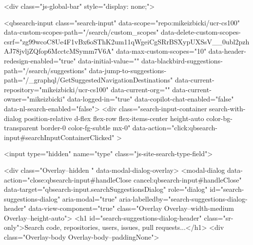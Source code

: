       <div class="js-global-bar" style="display: none;">
        


<qbsearch-input class="search-input" data-scope="repo:mikeizbicki/ucr-cs100" data-custom-scopes-path="/search/custom_scopes" data-delete-custom-scopes-csrf="zg99wcoC8Ue4F1vBx6oSThK2um11qWgeiCgSRrBSXypUXSsV__0ubl2pzhAJ78jvljZQfop6McctcMSymm7V6A" data-max-custom-scopes="10" data-header-redesign-enabled="true" data-initial-value="" data-blackbird-suggestions-path="/search/suggestions" data-jump-to-suggestions-path="/_graphql/GetSuggestedNavigationDestinations" data-current-repository="mikeizbicki/ucr-cs100" data-current-org="" data-current-owner="mikeizbicki" data-logged-in="true" data-copilot-chat-enabled="false" data-nl-search-enabled="false">
  <div
    class="search-input-container search-with-dialog position-relative d-flex flex-row flex-items-center height-auto color-bg-transparent border-0 color-fg-subtle mx-0"
    data-action="click:qbsearch-input#searchInputContainerClicked"
  >

    <input type="hidden" name="type" class="js-site-search-type-field">

    
<div class="Overlay--hidden " data-modal-dialog-overlay>
  <modal-dialog data-action="close:qbsearch-input#handleClose cancel:qbsearch-input#handleClose" data-target="qbsearch-input.searchSuggestionsDialog" role="dialog" id="search-suggestions-dialog" aria-modal="true" aria-labelledby="search-suggestions-dialog-header" data-view-component="true" class="Overlay Overlay--width-medium Overlay--height-auto">
      <h1 id="search-suggestions-dialog-header" class="sr-only">Search code, repositories, users, issues, pull requests...</h1>
    <div class="Overlay-body Overlay-body--paddingNone">
      
